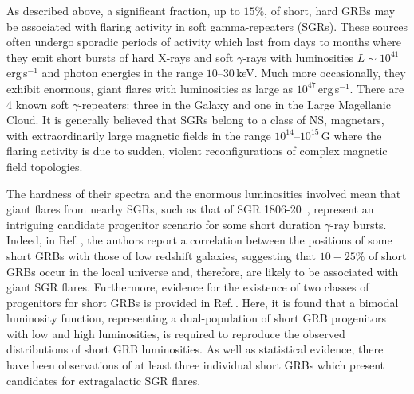 As described above, a significant fraction, up to $15\%$, of short, hard GRBs may be associated with flaring activity in soft gamma-repeaters (SGRs).  These sources often undergo sporadic periods of activity which last from days to months where they emit short bursts of hard X-rays and soft $\gamma$-rays with luminosities $L\sim 10^{41}$\,erg\,s$^{-1}$ and photon energies in the range $10\mbox{--}30$\,keV.  Much more occasionally, they exhibit enormous, giant flares with luminosities as large as $10^{47}$\,erg\,s$^{-1}$.  There are 4 known soft $\gamma$-repeaters: three in the Galaxy and one in the Large Magellanic Cloud. It is generally believed that SGRs belong to a class of NS, magnetars, with extraordinarily large magnetic fields in the range $10^{14}\mbox{--}10^{15}$\,G where the flaring activity is due to sudden, violent reconfigurations of complex magnetic field topologies.

The hardness of their spectra and the enormous luminosities involved mean that giant flares from nearby SGRs, such as that of SGR 1806-20~\cite{Hurley:2005}, represent an intriguing candidate progenitor scenario for some short duration $\gamma$-ray bursts.  Indeed, in Ref.\,\cite{Tanvir:2005}, the authors report a correlation between the positions of some short GRBs with those of low redshift galaxies, suggesting that $10-25\%$ of short GRBs occur in the local universe and, therefore, are likely to be associated with giant SGR flares.  Furthermore, evidence for the existence of two classes of progenitors for short GRBs is provided in Ref.\,\cite{Chapman:2009}.  Here, it is found that a bimodal luminosity function, representing a dual-population of short GRB progenitors with low and high luminosities, is required to reproduce the observed distributions of short GRB luminosities.  As well as statistical evidence, there have been observations of at least three individual short GRBs which present candidates for 
extragalactic SGR flares.

